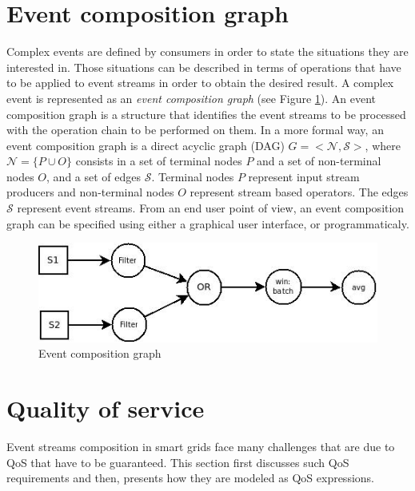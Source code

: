  \section{Event composition graph}
 \label{ch3:sec5}
 Complex events are defined by consumers in order to state the situations they are interested in. Those situations can be described in terms of operations that have to be applied to event streams in order to obtain the desired result.   
 A complex event is represented as an \textit{event composition graph} (see Figure \ref{fig:ecg}). An event composition graph is a structure that identifies the event streams to be processed with the operation chain to be performed on them. In a more formal way, an event composition graph is a direct acyclic graph (DAG) $G=<\mathcal{N}, \mathcal{S}>$, where $\mathcal{N}= \{P \cup O\}$ consists in a set of terminal nodes $P$ and a set of non-terminal nodes $O$, and a set of edges $\mathcal{S}$. Terminal nodes $P$ represent input stream producers and non-terminal nodes $O$ represent stream based operators. The edges $\mathcal{S}$ represent event streams. From an end user point of view, an event composition graph can be specified using either a graphical user interface, or programmaticaly. 
 \begin{figure}[H]
  \begin{center}
    \includegraphics[scale=0.65]{chap3/images/ecg.jpg}
  \end{center}
  \caption{Event composition graph}
  \label{fig:ecg}
\end{figure}
 
 \section{Quality of service}
 \label{ch3:sec-three}
 Event streams composition in smart grids face many challenges that are due to QoS that have to be guaranteed. This section first discusses such QoS requirements and then, presents how they are modeled as QoS expressions.              
